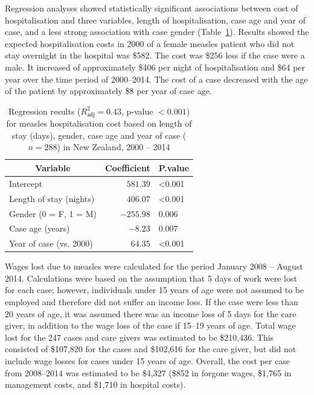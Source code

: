\documentclass{article}
\begin{document}
Regression analyses showed statistically significant associations between cost of hospitalisation and three variables, length of hospitalisation, case age and year of case, and a less strong association with case gender (Table~\ref{table:regression}). Results showed the expected hospitalisation costs in 2000 of a female measles patient who did not stay overnight in the hospital was \$582.  The cost was \$256 less if the case were a male. It increased of approximately \$406 per night of hospitalisation and \$64 per year over the time period of 2000--2014. The cost of a case decreased with the age of the patient by approximately \$8 per year of case age.


\begin{table}
\caption{Regression results ($R^{2}_\textsf{adj} = 0.43$, p-value $<0.001$) for measles hospitalisation cost based on length of stay (days), gender, case age and year of case ($n=288$) in New Zealand, 2000 -- 2014}
\begin{center}
\begin{tabular}{lrl}
\hline\hline
\multicolumn{1}{c}{Variable}&\multicolumn{1}{c}{Coefficient}&\multicolumn{1}{c}{P.value}\tabularnewline
\hline
Intercept&$ 581.39$&\textless  0.001\tabularnewline
Length of stay (nights)&$ 406.07$&\textless  0.001\tabularnewline
Gender (0 = F, 1 = M)&$-255.98$&0.006\tabularnewline
Case age (years)&$  -8.23$&0.007\tabularnewline
Year of case (vs. 2000)&$  64.35$&\textless  0.001\tabularnewline
\hline
\end{tabular}\end{center}\label{table:regression}
\end{table}

Wages lost due to measles were calculated for the period January 2008 -- August 2014. Calculations were based on the assumption that 5 days of work were lost for each case; however, individuals under 15 years of age were not assumed to be employed and therefore did not suffer an income loss. If the case were less than 20 years of age, it was assumed there was an income loss of 5 days for the care giver, in addition to the wage loss of the case if 15--19 years of age. Total wage lost for the 247 cases and care givers was estimated to be \$210,436. This consisted of \$107,820 for the cases and \$102,616 for the care giver, but did not include wage losses for cases under 15 years of age. Overall, the cost per case from 2008--2014 was estimated to be \$4,327 (\$852 in forgone wages, \$1,765 in management costs, and \$1,710 in hospital costs).
\end{document}
